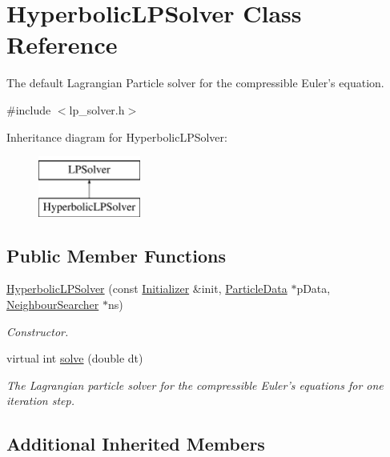 \hypertarget{classHyperbolicLPSolver}{\section{Hyperbolic\-L\-P\-Solver Class Reference}
\label{classHyperbolicLPSolver}
}


The default Lagrangian Particle solver for the compressible Euler's equation.  




{\ttfamily \#include $<$lp\-\_\-solver.\-h$>$}

Inheritance diagram for Hyperbolic\-L\-P\-Solver\-:\begin{figure}[H]
\begin{center}
\leavevmode
\includegraphics[height=2.000000cm]{classHyperbolicLPSolver}
\end{center}
\end{figure}
\subsection*{Public Member Functions}
\begin{DoxyCompactItemize}
\item 
\hyperlink{classHyperbolicLPSolver_a1b2ef77e7ddeb0e569dd73d974a8402d}{Hyperbolic\-L\-P\-Solver} (const \hyperlink{classInitializer}{Initializer} \&init, \hyperlink{classParticleData}{Particle\-Data} $\ast$p\-Data, \hyperlink{classNeighbourSearcher}{Neighbour\-Searcher} $\ast$ns)
\begin{DoxyCompactList}\small\item\em Constructor. \end{DoxyCompactList}\item 
virtual int \hyperlink{classHyperbolicLPSolver_a8f8cbda5f22f052208cdc4d4d03dc567}{solve} (double dt)
\begin{DoxyCompactList}\small\item\em The Lagrangian particle solver for the compressible Euler's equations for one iteration step. \end{DoxyCompactList}\end{DoxyCompactItemize}
\subsection*{Additional Inherited Members}


